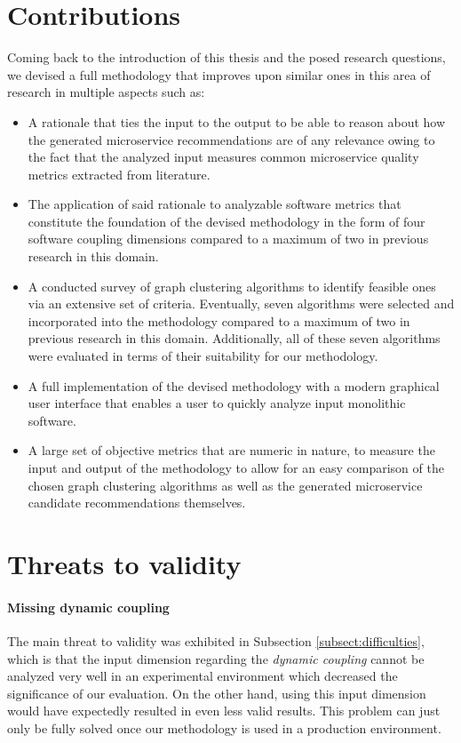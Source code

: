 \documentclass[12pt,a4paper]{report}
\begin{document}
\section{Contributions}

Coming back to the introduction of this thesis and the posed research
questions, we devised a full methodology that improves upon similar ones in
this area of research in multiple aspects such as:

\begin{itemize}
    \item A rationale that ties the input to the output to be able to reason
    about how the generated microservice recommendations are of any relevance
    owing to the fact that the analyzed input measures common microservice
    quality metrics extracted from literature.
    \item The application of said rationale to analyzable software metrics
    that constitute the foundation of the devised methodology in the form
    of four software coupling dimensions compared to a maximum
    of two in previous research in this domain.
    \item A conducted survey of graph clustering algorithms to identify feasible
    ones via an extensive set of criteria. Eventually, seven algorithms were
    selected and incorporated into the methodology compared to a maximum
    of two in previous research in this domain. Additionally, all of these seven
    algorithms were evaluated in terms of their suitability for our methodology.
    \item A full implementation of the devised methodology with a modern
    graphical user interface that enables a user to quickly analyze input
    monolithic software.
    \item A large set of objective metrics that are numeric in nature,
    to measure the input and output of the methodology to allow for an
    easy comparison of the chosen graph clustering algorithms as well as
    the generated microservice candidate recommendations themselves.
\end{itemize}



\section{Threats to validity} \label{sect:threats-to-validity}

\paragraph{Missing dynamic coupling}
The main threat to validity was exhibited
in Subsection \ref{subsect:difficulties}, which is that the input dimension
regarding the \textit{dynamic coupling} cannot be analyzed very well in an
experimental environment which decreased the significance of our evaluation. On
the other hand, using this input dimension would have expectedly resulted in
even less valid results. This problem can just only be fully solved once our
methodology is used in a production environment.
\end{document}
